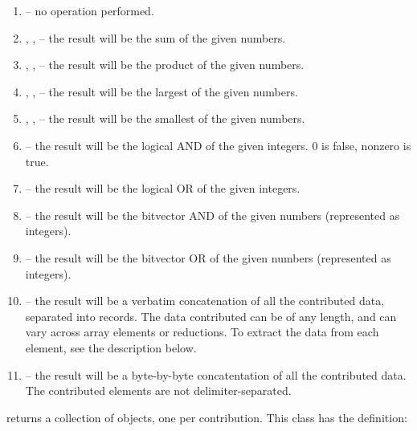\begin{enumerate}

\item {}-- no operation performed.

\item {}, , -- the
result will be the sum of the given numbers.

\item {}, ,
-- the result will be the product of the given numbers.

\item {}, , -- the
result will be the largest of the given numbers.

\item {}, , -- the
result will be the smallest of the given numbers.

\item {}-- the result will be the logical AND of the given
integers.  0 is false, nonzero is true.

\item {}-- the result will be the logical OR of the given
integers.

\item {}-- the result will be the bitvector AND of the given numbers (represented as integers).

\item {}-- the result will be the bitvector OR of the given numbers (represented as integers).

\item {}-- the result will be a verbatim concatenation of
all the contributed data, separated into  records.
The data contributed can be of any length, and can vary across array elements
or reductions.  To extract the data from each element, see the description
below.

\item {}-- the result will be a byte-by-byte
concatentation of all the contributed data.  The contributed elements
are not delimiter-separated. 

\end{enumerate}


 returns a collection of 
objects, one per contribution.  This class has the definition:

